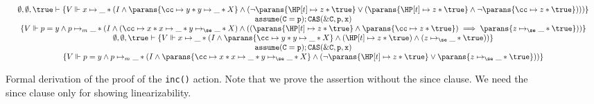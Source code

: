 \begin{figure*}
\begin{small}
\[\begin{array}{c}
{{{{\begin{array}{c}
\begin{array}{c}
  \emptyset,\emptyset,\true \vdash \{
  V \Vdash 
  x \mapsto \_  
  *
  ( 
  I
  \land
  \parans{\cc \mapsto y * y \mapsto \_ * X}
  \land
  (\neg\parans{\HP[t]\mapsto z * \true} 
   \lor (\parans{\HP[t]\mapsto z*\true} \land \neg\parans{\cc \mapsto z * \true}))
  )
  \}
  \\
  \,\mathtt{assume(C=p); CAS(\&C, p, x)}\,\\
  \{
  V \Vdash 
  p = y 
  \land
  p \mapsto_m \_  
  * 
  (
  I
  \land
  (\cc \mapsto x * x \mapsto \_ * y \mapsto_{\se} \_ * X)
  \land
  ((\parans{\HP[t]\mapsto z * \true} \land  \parans{\cc \mapsto z * \true}) \implies \parans{z \mapsto_{\se} \_ * \true})
  )
  \}
\end{array}
\\[6pt]
\begin{array}{c}
  \emptyset,\emptyset,\true \vdash \{
  V \Vdash 
  x \mapsto \_  
  * 
  (
  I
  \land 
  \parans{\cc \mapsto y * y \mapsto \_ * X}
  \land
  (\HP[t] \mapsto z * \true) 
  \land
  (z \mapsto_{\se} \_ * \true)
  ) 
  \}
  \\
  \,\mathtt{assume(C=p); CAS(\&C, p, x)}\,\\
  \{
  V \Vdash
  p = y
  \land
  p \mapsto_m \_   
  * 
  (
  I
  \land 
  \parans{\cc \mapsto x * x \mapsto \_ * y \mapsto_{\se} \_ * X}
  \land
  (\neg\parans{\HP[t]\mapsto z * \true} \lor \parans{z \mapsto_{\se} \_ * \true})
  )
  \}
\end{array}
\end{array}
}}}}

\end{array}
\]
\end{small}
\caption{\label{fig:hazard:inc}Formal derivation of the proof of the \texttt{inc()} action.
Note that we prove the assertion without the since clause.
We need the since clause only for showing linearizability.}
\end{figure*}



